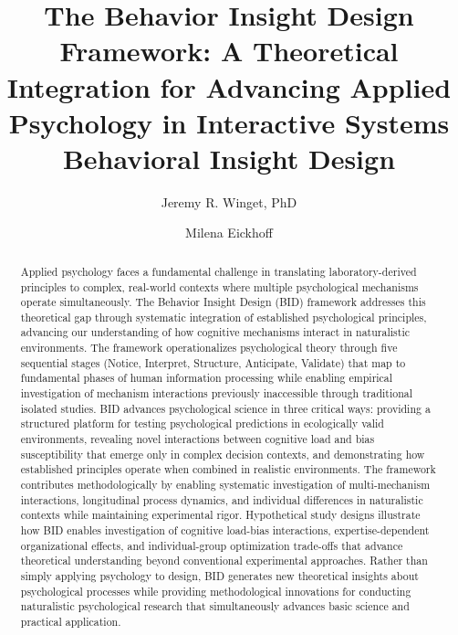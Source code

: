\documentclass[
  authoryear,
  preprint]{elsarticle}
\begin{document}
\begin{frontmatter}
\title{The Behavior Insight Design Framework: A Theoretical Integration
for Advancing Applied Psychology in Interactive
Systems \\\large{Behavioral Insight Design} }
\author[1]{Jeremy R. Winget, PhD%
%
}
\author[2]{Milena Eickhoff%
%
}



        
\begin{abstract}
Applied psychology faces a fundamental challenge in translating
laboratory-derived principles to complex, real-world contexts where
multiple psychological mechanisms operate simultaneously. The Behavior
Insight Design (BID) framework addresses this theoretical gap through
systematic integration of established psychological principles,
advancing our understanding of how cognitive mechanisms interact in
naturalistic environments. The framework operationalizes psychological
theory through five sequential stages (Notice, Interpret, Structure,
Anticipate, Validate) that map to fundamental phases of human
information processing while enabling empirical investigation of
mechanism interactions previously inaccessible through traditional
isolated studies. BID advances psychological science in three critical
ways: providing a structured platform for testing psychological
predictions in ecologically valid environments, revealing novel
interactions between cognitive load and bias susceptibility that emerge
only in complex decision contexts, and demonstrating how established
principles operate when combined in realistic environments. The
framework contributes methodologically by enabling systematic
investigation of multi-mechanism interactions, longitudinal process
dynamics, and individual differences in naturalistic contexts while
maintaining experimental rigor. Hypothetical study designs illustrate
how BID enables investigation of cognitive load-bias interactions,
expertise-dependent organizational effects, and individual-group
optimization trade-offs that advance theoretical understanding beyond
conventional experimental approaches. Rather than simply applying
psychology to design, BID generates new theoretical insights about
psychological processes while providing methodological innovations for
conducting naturalistic psychological research that simultaneously
advances basic science and practical application.
\end{abstract}






\end{frontmatter}
\end{document}
